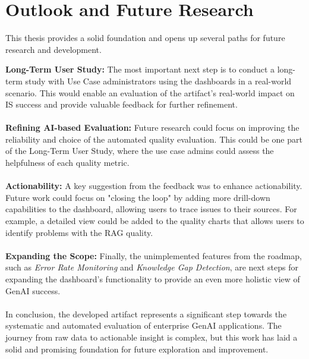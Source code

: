 \documentclass[
	english,
	ruledheaders=section,%
	class=report,%
	thesis={type=bachelor},%
	accentcolor=1b,%
	custommargins=true,%
	marginpar=false,%
	parskip=half-,%
	fontsize=11pt,%
	DIV=14,
]{tudapub}
\begin{document}
\section{Outlook and Future Research}
This thesis provides a solid foundation and opens up several paths for future research and development.

\textbf{Long-Term User Study:} The most important next step is to conduct a long-term study with Use Case administrators using the dashboards in a real-world scenario. This would enable an evaluation of the artifact's real-world impact on IS success \parencite{DeloneMcLean2003ISSuccessTenYearUpdate} and provide valuable feedback for further refinement.\\
\\
\textbf{Refining AI-based Evaluation:} Future research could focus on improving the reliability and choice of the automated quality evaluation. This could be one part of the Long-Term User Study, where the use case admins could assess the helpfulness of each quality metric.\\
\\
\textbf{Actionability:} A key suggestion from the feedback was to enhance actionability. Future work could focus on "closing the loop" by adding more drill-down capabilities to the dashboard, allowing users to trace issues to their sources. For example, a detailed view could be added to the quality charts that allows users to identify problems with the RAG quality.\\
\\
\textbf{Expanding the Scope:} Finally, the unimplemented features from the roadmap, such as \textit{Error Rate Monitoring} and \textit{Knowledge Gap Detection}, are next steps for expanding the dashboard's functionality to provide an even more holistic view of GenAI success.\\
\\
In conclusion, the developed artifact represents a significant step towards the systematic and automated evaluation of enterprise GenAI applications. The journey from raw data to actionable insight is complex, but this work has laid a solid and promising foundation for future exploration and improvement.

\end{document}
